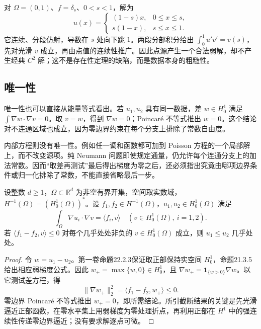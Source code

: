 \ProseParagraphBreak

对 \(\Omega=(0,1)\)、\(f=\delta_s\)、\(0<s<1\)，解为
\[
 u(x)=\begin{cases}(1-s)x,&0\le x\le s,\\s(1-x),&s\le x\le1.\end{cases}
\]
它连续、分段仿射，导数在 \(s\) 处向下跳 \(1\)。两段分部积分给出 \(\int_0^1u'v'=v(s)\)，先对光滑 \(v\) 成立，再由点值的连续性推广。因此点源产生一个合法弱解，却不产生经典 \(C^2\) 解；这不是存在性定理的缺陷，而是数据本身的粗糙性。

\subsection{唯一性}
\label{b2:subsec:150302}

唯一性也可以直接从能量等式看出。若 \(u_1,u_2\) 具有同一数据，差 \(w\in H_0^1\) 满足 \(\int\nabla w\cdot\nabla v=0\)。取 \(v=w\)，得到 \(\nabla w=0\)；Poincaré 不等式推出 \(w=0\)。这个结论对不连通区域也成立，因为零边界约束在每个分支上排除了常数自由度。

\ProseParagraphBreak

内部方程则没有唯一性。例如任一调和函数都可加到 Poisson 方程的一个局部解上，而不改变源项。纯 Neumann 问题即使规定通量，仍允许每个连通分支上的加法常数。因而“取差再测试”最后得出梯度为零之后，还必须指出究竟由哪项边界条件或归一化排除了常数，不能直接省略最后一步。

\begin{proposition}[弱比较原理]
\label{b2:prop:15-weak-comparison}
设整数 \(d\geq1\)，\(\Omega\subset\mathbb R^d\) 为非空有界开集，空间取实数域，\(H^{-1}(\Omega)=(H_0^1(\Omega))^*\)。设 \(f_1,f_2\in H^{-1}(\Omega)\)，\(u_1,u_2\in H_0^1(\Omega)\) 满足
\[
 \int_\Omega\nabla u_i\cdot\nabla v=\langle f_i,v\rangle
 \quad(v\in H_0^1(\Omega),\ i=1,2).
\]
若 \(\langle f_1-f_2,v\rangle\le0\) 对每个几乎处处非负的 \(v\in H_0^1(\Omega)\) 成立，则 \(u_1\le u_2\) 几乎处处。
\end{proposition}
\begin{proof}
令 \(w=u_1-u_2\)。第一卷命题22.2.3保证取正部保持实空间 \(H_0^1\)，命题21.3.5给出相应弱梯度公式。因此 \(w_+=\max\{w,0\}\in H_0^1\)，且 \(\nabla w_+=\mathbf1_{\{w>0\}}\nabla w\)。以它测试差方程，得
\[\lVert\nabla w_+\rVert_2^2=\langle f_1-f_2,w_+\rangle\le0.\]
零边界 Poincaré 不等式推出 \(w_+=0\)，即所需结论。所引截断结果的关键是先光滑逼近正部函数，在零水平集上用弱梯度为零处理折点，再利用正部在 \(H^1\) 中的强连续性传递零边界逼近；没有要求解逐点可微。
\end{proof}

